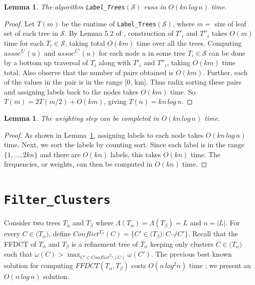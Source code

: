 \documentclass[final,1p,times]{elsarticle}
\newcommand{\compatible}{\smile}
\newcommand{\leafset}{\Lambda}
\newcommand{\weight}{\omega}
\newcommand{\TA}{T_\alpha}
\newcommand{\TB}{T_\beta}
\newtheorem{lemma}[theorem]{Lemma}
\begin{document}
    \medskip
    \begin{lemma}
        \label{lem:labelclustersruntime}
        The algorithm \texttt{Label\_Trees}$(\mathcal{S})$ runs in $O(kn\,log\,n)$ time.
    \end{lemma}
        \begin{proof}
            Let $T(m)$ be the runtime of \texttt{Label\_Trees}$(\mathcal{S})$, where $m =$ size of leaf set of each tree in $\mathcal{S}$. By Lemma 5.2 of \cite{farach1995fast}, construction of $T'_i$ and $T''_i$ takes $O(m)$ time for each $T_i \in \mathcal{S}$, taking total $O(km)$ time over all the trees. Computing $assoc^{L'}(u)$ and $assoc^{L''}(u)$ for each node $u$ in some tree $T_i \in \mathcal{S}$ can be done by a bottom up traversal of $T_i$ along with $T'_i$ and $T''_i$, taking $O(km)$ time total. Also observe that the number of pairs obtained is $O(km)$. Further, each of the values in the pair is in the range [0, km]. Thus radix sorting these pairs and assigning labels back to the nodes takes $O(km)$ time. So $T(m) = 2T(m/2) + O(km)$, giving $T(n) = kn\,log\,n$.
        \end{proof}

    \medskip
    \begin{lemma}
        \label{lem:weightingruntime}
        The weighting step can be completed in $O(kn\,log\,n)$ time.
    \end{lemma}
        \begin{proof}
		As shown in Lemma~\ref{lem:labelclustersruntime}, assigning labels to each node takes $O(kn\,log\,n)$ time. Next, we sort the labels by counting sort. Since each label is in the range $\{1, \ldots, 2kn\}$ and there are $O(kn)$ labels, this takes $O(kn)$ time. The frequencies, or weights, can then be computed in $O(kn)$ time.
        \end{proof}

    \section{\texttt{Filter\_Clusters}}
    \label{sec:filterclusters}

    Consider two trees $\TA$ and $\TB$ where $\leafset(\TA) = \leafset(\TB) = L$ and $n = |L|$.
    For every $C \in \mathcal(\TA)$, define $Conflict^{\TB}(C) =  \{C' \in \mathcal(\TB) : C \not\compatible C' \}$.
    Recall that the FFDCT of $\TA$ and $\TB$ is a refinement tree of $\TA$ keeping only clusters $C \in \mathcal(\TA)$ such that $\weight(C) > \max_{C' \in Conflict^{\TB}(C)} \weight(C')$.
    The previous best known solution for computing $FFDCT(\TA, \TB)$ costs $O(n\,log^2 n)$ time \cite{jansson2018algorithms}; we present an $O(n\,log\,n)$ solution.
\end{document}
